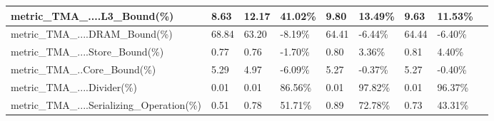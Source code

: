 \documentclass[12pt]{article}
\begin{document}
\begin{longtable}{|m{139.55pt}|m{40.35pt}|m{36.25pt}|m{36.25pt}|m{36.25pt}|m{42.10pt}|m{30.30pt}|m{44.65pt}|@{}m{0pt}@{}}
\raggedright\arraybackslash{}metric\_\allowbreak{}TMA\_\allowbreak{}....L3\_\allowbreak{}Bound(\%) & \centering\arraybackslash{}8.63 & \centering\arraybackslash{}12.17 & \cellcolor[HTML]{D9D9D9}\centering\arraybackslash{}41.02\% & \centering\arraybackslash{}9.80 & \cellcolor[HTML]{D9D9D9}\centering\arraybackslash{}13.49\% & \centering\arraybackslash{}9.63 & \cellcolor[HTML]{D9D9D9}\centering\arraybackslash{}11.53\% & \rule[-0.00pt]{0pt}{14.40pt} \\ \hline
\raggedright\arraybackslash{}metric\_\allowbreak{}TMA\_\allowbreak{}....DRAM\_\allowbreak{}Bound(\%) & \centering\arraybackslash{}68.84 & \centering\arraybackslash{}63.20 & \cellcolor[HTML]{D9D9D9}\centering\arraybackslash{}-8.19\% & \centering\arraybackslash{}64.41 & \cellcolor[HTML]{D9D9D9}\centering\arraybackslash{}-6.44\% & \centering\arraybackslash{}64.44 & \cellcolor[HTML]{D9D9D9}\centering\arraybackslash{}-6.40\% & \rule[-0.00pt]{0pt}{14.40pt} \\ \hline
\raggedright\arraybackslash{}metric\_\allowbreak{}TMA\_\allowbreak{}....Store\_\allowbreak{}Bound(\%) & \centering\arraybackslash{}0.77 & \centering\arraybackslash{}0.76 & \cellcolor[HTML]{D9D9D9}\centering\arraybackslash{}-1.70\% & \centering\arraybackslash{}0.80 & \cellcolor[HTML]{D9D9D9}\centering\arraybackslash{}3.36\% & \centering\arraybackslash{}0.81 & \cellcolor[HTML]{D9D9D9}\centering\arraybackslash{}4.40\% & \rule[-0.00pt]{0pt}{14.40pt} \\ \hline
\raggedright\arraybackslash{}metric\_\allowbreak{}TMA\_\allowbreak{}..Core\_\allowbreak{}Bound(\%) & \centering\arraybackslash{}5.29 & \centering\arraybackslash{}4.97 & \cellcolor[HTML]{D9D9D9}\centering\arraybackslash{}-6.09\% & \centering\arraybackslash{}5.27 & \cellcolor[HTML]{D9D9D9}\centering\arraybackslash{}-0.37\% & \centering\arraybackslash{}5.27 & \cellcolor[HTML]{D9D9D9}\centering\arraybackslash{}-0.40\% & \rule[-0.00pt]{0pt}{14.40pt} \\ \hline
\raggedright\arraybackslash{}metric\_\allowbreak{}TMA\_\allowbreak{}....Divider(\%) & \centering\arraybackslash{}0.01 & \centering\arraybackslash{}0.01 & \cellcolor[HTML]{D9D9D9}\centering\arraybackslash{}86.56\% & \centering\arraybackslash{}0.01 & \cellcolor[HTML]{D9D9D9}\centering\arraybackslash{}97.82\% & \centering\arraybackslash{}0.01 & \cellcolor[HTML]{D9D9D9}\centering\arraybackslash{}96.37\% & \rule[-0.00pt]{0pt}{14.40pt} \\ \hline
\raggedright\arraybackslash{}metric\_\allowbreak{}TMA\_\allowbreak{}....Serializing\_\allowbreak{}Operation(\%) & \centering\arraybackslash{}0.51 & \centering\arraybackslash{}0.78 & \cellcolor[HTML]{D9D9D9}\centering\arraybackslash{}51.71\% & \centering\arraybackslash{}0.89 & \cellcolor[HTML]{D9D9D9}\centering\arraybackslash{}72.78\% & \centering\arraybackslash{}0.73 & \cellcolor[HTML]{D9D9D9}\centering\arraybackslash{}43.31\% & \rule[-0.00pt]{0pt}{14.40pt} \\ \hline

\end{longtable}
\end{document}
